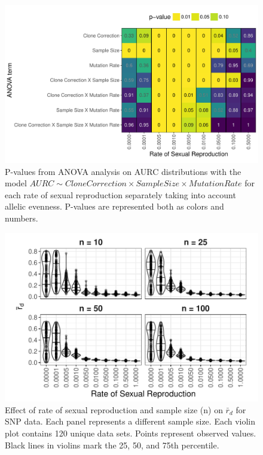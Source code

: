 \documentclass[]{article}
\theoremstyle{definition}
\theoremstyle{definition}
\theoremstyle{remark}
\begin{document}
\begin{figure}
\centering
\includegraphics[width=1.00000\textwidth]{figure/AURC_ANOVA_ea.pdf}
\caption{P-values from ANOVA analysis on AURC distributions with the
model
\(AURC \sim Clone Correction \times Sample Size \times Mutation Rate\)
for each rate of sexual reproduction separately taking into account
allelic evenness. P-values are represented both as colors and
numbers.}\label{fig:sim3a}
\end{figure}

\begin{figure}
\centering
\includegraphics[width=1.00000\textwidth]{figure/genomic_rd.pdf}
\caption{Effect of rate of sexual reproduction and sample size (n) on
\(\bar{r}_d\) for SNP data. Each panel represents a different sample
size. Each violin plot contains 120 unique data sets. Points represent
observed values. Black lines in violins mark the 25, 50, and 75th
percentile.}\label{fig:sim5}
\end{figure}
\end{document}
